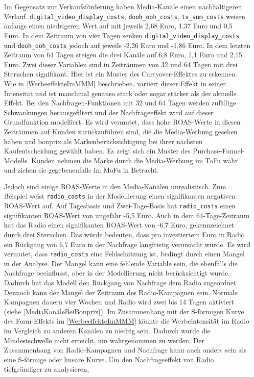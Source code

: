 Im Gegensatz zur Verkaufsförderung haben Media-Kanäle einen nachhaltigeren Verlauf. \verb|digital_video_display_costs|, \verb|dooh_ooh_costs|, \verb|tv_sum_costs| weisen anfangs einen niedrigeren Wert auf mit jeweils 2,68 Euro, 1,37 Euro und 0,5 Euro. In dem Zeitraum von vier Tagen senken \verb|digital_video_display_costs| und \verb|dooh_ooh_costs| jedoch auf jeweils -2,26 Euro und -1,86 Euro. In dem letzten Zeitraum von 64 Tagen steigen die drei Kanäle auf 6,8 Euro, 1,1 Euro und 2,15 Euro. Zwei dieser Variablen sind in Zeiträumen von 32 und 64 Tagen mit drei Sternchen signifikant. Hier ist ein Muster des Carryover-Effektes zu erkennen. Wie in \autoref{WerbeeffekteImMMM} beschrieben, variiert dieser Effekt in seiner Intensität und ist manchmal genauso stark oder sogar stärker als der aktuelle Effekt. Bei den Nachfragen-Funktionen mit 32 und 64 Tagen werden zufällige Schwankungen herausgefiltert und der Nachfrageeffekt wird auf dieser Grundfunktion modelliert. Es wird vermutet, dass hohe \ac{ROAS}-Werte in diesen Zeiträumen auf Kunden zurückzuführen sind, die die Media-Werbung gesehen haben und bonprix als Markenberücksichtigung bei ihrer nächsten Kaufentscheidung gewählt haben. Es zeigt sich ein Muster des Purchase-Funnel-Modells. Kunden nehmen die Marke durch die Media-Werbung im \ac{ToFu} wahr und ziehen sie gegebenenfalls im \ac{MoFu} in Betracht. \par
Jedoch sind einige \ac{ROAS}-Werte in den Media-Kanälen unrealistisch. Zum Beispiel weist \verb|radio_costs| in der Modellierung einen signifikanten negativen \ac{ROAS}-Wert auf. Auf Tagesbasis und Zwei-Tage-Basis hat \verb|radio_costs| einen signifikanten \ac{ROAS}-Wert von ungefähr -5,5 Euro. Auch in dem 64-Tage-Zeitraum hat das Radio einen signifikanten \ac{ROAS}-Wert von -6,7 Euro, gekennzeichnet durch drei Sternchen. Das würde bedeuten, dass pro investiertem Euro in Radio ein Rückgang von 6,7 Euro in der Nachfrage langfristig verursacht würde. Es wird vermutet, dass \verb|radio_costs| eine Fehlschätzung ist, bedingt durch einen Mangel in der Analyse. Der Mangel kann eine fehlende Variable sein, die ebenfalls die Nachfrage beeinflusst, aber in der Modellierung nicht berücksichtigt wurde. Dadurch hat das Modell den Rückgang von Nachfrage dem Radio zugeordnet. Dennoch kann der Mangel der Zeitraum des Radio-Kampagnen sein. Normale Kampagnen dauern vier Wochen und Radio wird zwei bis 14 Tagen aktiviert (siehe \autoref{MediaKanäleBeiBonprix}). Im Zusammenhang mit der S-förmigen Kurve des Form-Effekts im \autoref{WerbeeffekteImMMM} könnte die Werbeintensität im Radio im Vergleich zu anderen Kanälen zu niedrig sein. Dadurch wurde die Mindestschwelle nicht erreicht, um wahrgenommen zu werden. Der Zusammenhang von Radio-Kampagnen und Nachfrage kann auch anders sein als eine S-förmige oder lineare Kurve. Um den Nachfrageeffekt von Radio tiefgründiger zu analysieren, 
